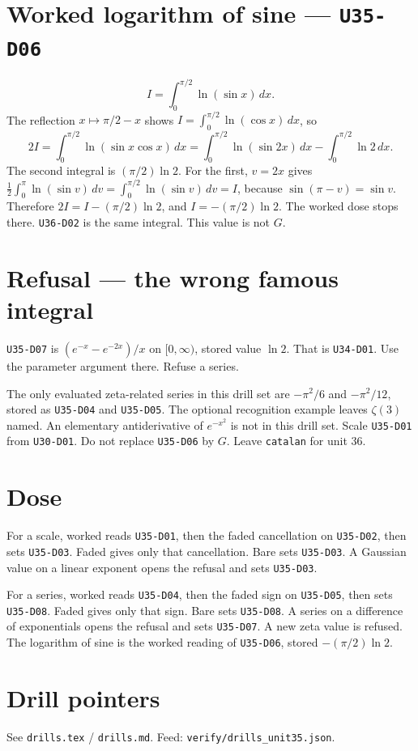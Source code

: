 \section{Worked logarithm of sine --- \texttt{U35-D06}}
\[
I=\int_0^{\pi/2}\ln(\sin x)\,dx.
\]
The reflection $x\mapsto\pi/2-x$ shows $I=\int_0^{\pi/2}\ln(\cos x)\,dx$, so
\[
2I=\int_0^{\pi/2}\ln(\sin x\cos x)\,dx=\int_0^{\pi/2}\ln(\sin 2x)\,dx-\int_0^{\pi/2}\ln 2\,dx.
\]
The second integral is $(\pi/2)\ln 2$. For the first, $v=2x$ gives $\frac12\int_0^{\pi}\ln(\sin v)\,dv=\int_0^{\pi/2}\ln(\sin v)\,dv=I$, because $\sin(\pi-v)=\sin v$. Therefore $2I=I-(\pi/2)\ln 2$, and $I=-(\pi/2)\ln 2$. The worked dose stops there. \texttt{U36-D02} is the same integral. This value is not $G$.

\section{Refusal --- the wrong famous integral}
\texttt{U35-D07} is $(e^{-x}-e^{-2x})/x$ on $[0,\infty)$, stored value $\ln 2$. That is \texttt{U34-D01}. Use the parameter argument there. Refuse a series.

The only evaluated zeta-related series in this drill set are $-\pi^2/6$ and $-\pi^2/12$, stored as \texttt{U35-D04} and \texttt{U35-D05}. The optional recognition example leaves $\zeta(3)$ named. An elementary antiderivative of $e^{-x^2}$ is not in this drill set. Scale \texttt{U35-D01} from \texttt{U30-D01}. Do not replace \texttt{U35-D06} by $G$. Leave \texttt{catalan} for unit 36.

\section{Dose}
For a scale, worked reads \texttt{U35-D01}, then the faded cancellation on \texttt{U35-D02}, then sets \texttt{U35-D03}. Faded gives only that cancellation. Bare sets \texttt{U35-D03}. A Gaussian value on a linear exponent opens the refusal and sets \texttt{U35-D03}.

For a series, worked reads \texttt{U35-D04}, then the faded sign on \texttt{U35-D05}, then sets \texttt{U35-D08}. Faded gives only that sign. Bare sets \texttt{U35-D08}. A series on a difference of exponentials opens the refusal and sets \texttt{U35-D07}. A new zeta value is refused. The logarithm of sine is the worked reading of \texttt{U35-D06}, stored $-(\pi/2)\ln 2$.

\section{Drill pointers}
See \texttt{drills.tex} / \texttt{drills.md}. Feed: \texttt{verify/drills\_unit35.json}.

